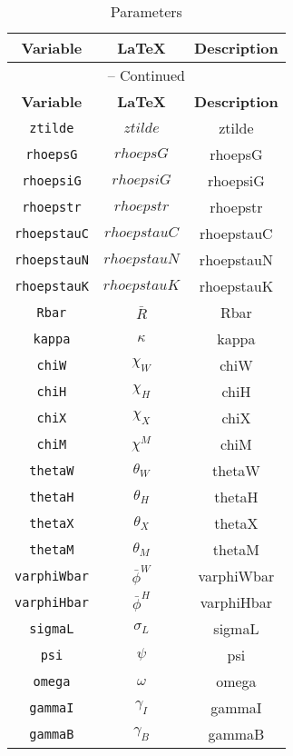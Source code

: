 \begin{center}
\begin{longtable}{ccc}
\caption{Parameters}\\%
\hline%
\multicolumn{1}{c}{\textbf{Variable}} &
\multicolumn{1}{c}{\textbf{\LaTeX}} &
\multicolumn{1}{c}{\textbf{Description}}\\%
\hline\hline%
\endfirsthead
\multicolumn{3}{c}{{\tablename} \thetable{} -- Continued}\\%
\hline%
\multicolumn{1}{c}{\textbf{Variable}} &
\multicolumn{1}{c}{\textbf{\LaTeX}} &
\multicolumn{1}{c}{\textbf{Description}}\\%
\hline\hline%
\endhead
\texttt{ztilde} & $ztilde$ & ztilde\\
\texttt{rhoepsG} & $rhoepsG$ & rhoepsG\\
\texttt{rhoepsiG} & $rhoepsiG$ & rhoepsiG\\
\texttt{rhoepstr} & $rhoepstr$ & rhoepstr\\
\texttt{rhoepstauC} & $rhoepstauC$ & rhoepstauC\\
\texttt{rhoepstauN} & $rhoepstauN$ & rhoepstauN\\
\texttt{rhoepstauK} & $rhoepstauK$ & rhoepstauK\\
\texttt{Rbar} & $\bar{R}$ & Rbar\\
\texttt{kappa} & $\kappa$ & kappa\\
\texttt{chiW} & $\chi_W$ & chiW\\
\texttt{chiH} & $\chi_H$ & chiH\\
\texttt{chiX} & $\chi_X$ & chiX\\
\texttt{chiM} & $\chi^M$ & chiM\\
\texttt{thetaW} & $\theta_W$ & thetaW\\
\texttt{thetaH} & $\theta_H$ & thetaH\\
\texttt{thetaX} & $\theta_X$ & thetaX\\
\texttt{thetaM} & $\theta_M$ & thetaM\\
\texttt{varphiWbar} & $\bar{\phi}^W$ & varphiWbar\\
\texttt{varphiHbar} & $\bar{\phi}^H$ & varphiHbar\\
\texttt{sigmaL} & $\sigma_L$ & sigmaL\\
\texttt{psi} & $\psi$ & psi\\
\texttt{omega} & $\omega$ & omega\\
\texttt{gammaI} & $\gamma_I$ & gammaI\\
\texttt{gammaB} & $\gamma_{B}$ & gammaB\\

\end{longtable}
\end{center}
